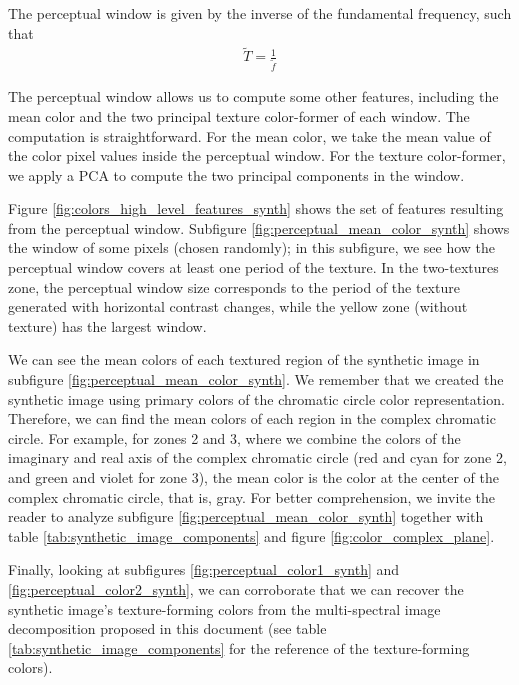 The perceptual window is given by the inverse of the fundamental frequency, such that
\begin{gather}
    \widetilde{T} = \frac{1}{\widetilde{f}} \label{eq:perceptual_window}
\end{gather}

The perceptual window allows us to compute some other features, including the mean color and the two principal texture color-former of each window. The computation is straightforward. For the mean color, we take the mean value of the color pixel values inside the perceptual window. For the texture color-former, we apply a PCA to compute the two principal components in the window. 

Figure \ref{fig:colors_high_level_features_synth} shows the set of features resulting from the perceptual window. Subfigure \ref{fig:perceptual_mean_color_synth} shows the window of some pixels (chosen randomly); in this subfigure, we see how the perceptual window covers at least one period of the texture. In the two-textures zone, the perceptual window size corresponds to the period of the texture generated with horizontal contrast changes, while the yellow zone (without texture) has the largest window. 

We can see the mean colors of each textured region of the synthetic image in subfigure \ref{fig:perceptual_mean_color_synth}. We remember that we created the synthetic image using primary colors of the chromatic circle color representation. Therefore, we can find the mean colors of each region in the complex chromatic circle. For example, for zones 2 and 3, where we combine the colors of the imaginary and real axis of the complex chromatic circle (red and cyan for zone 2, and green and violet for zone 3), the mean color is the color at the center of the complex chromatic circle, that is, gray. For better comprehension, we invite the reader to analyze subfigure \ref{fig:perceptual_mean_color_synth} together with table \ref{tab:synthetic_image_components} and figure \ref{fig:color_complex_plane}.

Finally, looking at subfigures \ref{fig:perceptual_color1_synth} and \ref{fig:perceptual_color2_synth}, we can corroborate that we can recover the synthetic image's texture-forming colors from the multi-spectral image decomposition proposed in this document (see table \ref{tab:synthetic_image_components} for the reference of the texture-forming colors).

